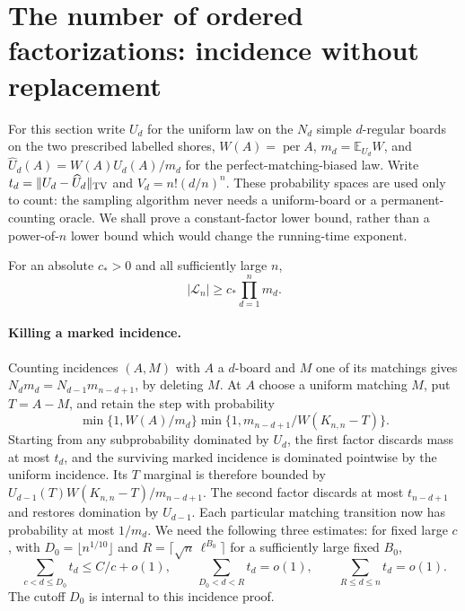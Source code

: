 \section{The number of ordered factorizations: incidence without replacement}
\label{sec:incidence}
For this section write $U_d$ for the uniform law on the $N_d$ simple
$d$-regular boards on the two prescribed labelled shores, $W(A)=\operatorname{per}A$,
$m_d=\mathbb E_{U_d}W$, and $\widehat U_d(A)=W(A)U_d(A)/m_d$ for the
perfect-matching-biased law. Write $t_d=\|U_d-\widehat U_d\|_{\rm TV}$
and $V_d=n!(d/n)^n$. These probability spaces are used only to count:
the sampling algorithm never needs a uniform-board or a permanent-counting oracle.
We shall prove a constant-factor lower bound, rather than a power-of-$n$
lower bound which would change the running-time exponent.

\begin{proposition}\label{prop:count-lower}
For an absolute $c_*>0$ and all sufficiently large $n$,
\[
 |\mathcal L_n|\ge c_*\prod_{d=1}^n m_d .
\]
\end{proposition}

\paragraph{Killing a marked incidence.}
Counting incidences $(A,M)$ with $A$ a $d$-board and $M$ one of its
matchings gives $N_d m_d=N_{d-1}m_{n-d+1}$, by deleting $M$.
At $A$ choose a uniform matching $M$, put $T=A-M$, and retain the step
with probability
\[
 \min\{1,W(A)/m_d\}\min\{1,m_{n-d+1}/W(K_{n,n}-T)\}.
\]
Starting from any subprobability dominated by $U_d$, the first factor
discards mass at most $t_d$, and the surviving marked incidence is
dominated pointwise by the uniform incidence. Its $T$ marginal is
therefore bounded by $U_{d-1}(T)W(K_{n,n}-T)/m_{n-d+1}$.
The second factor discards at most $t_{n-d+1}$ and restores domination
by $U_{d-1}$. Each particular matching transition now has probability
at most $1/m_d$. We need the following three estimates:
for fixed large $c$, with $D_0=\lfloor n^{1/10}\rfloor$ and
$R=\lceil\sqrt n\,\ell^{B_0}\rceil$ for a sufficiently large fixed $B_0$,
\[
 \sum_{c<d\le D_0}t_d\le C/c+o(1),\qquad
 \sum_{D_0<d<R}t_d=o(1),\qquad \sum_{R\le d\le n}t_d=o(1).
\]
The cutoff $D_0$ is internal to this incidence proof.
